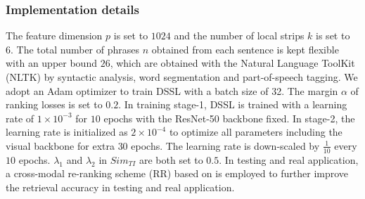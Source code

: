 \documentclass[sigconf]{acmart}
\begin{document}
\subsubsection{Implementation details}
The feature dimension $p$ is set to $1024$ and the number of local strips $k$ is set to 6. The total number of phrases $n$ obtained from each sentence is kept flexible with an upper bound $26$, which are obtained with the Natural Language ToolKit (NLTK) by syntactic analysis, word segmentation and part-of-speech tagging. We adopt an Adam optimizer to train DSSL with a batch size of 32. The margin $\alpha$ of ranking losses is set to $0.2$. In training stage-1, DSSL is trained with a learning rate of $1\times10^{-3}$ for $10$ epochs with the ResNet-50 backbone fixed. In stage-2, the learning rate is initialized as $2\times10^{-4}$ to optimize all parameters including the visual backbone for extra $30$ epochs. The learning rate is down-scaled by $\frac{1}{10}$ every $10$ epochs. $\lambda_{1}$ and $\lambda_{2}$ in $Sim_{TI}$ are both set to $0.5$. In testing and real application, a cross-modal re-ranking scheme (RR) based on \cite{wang2019matchingRR} is employed to further improve the retrieval accuracy in testing and real application.
\end{document}
